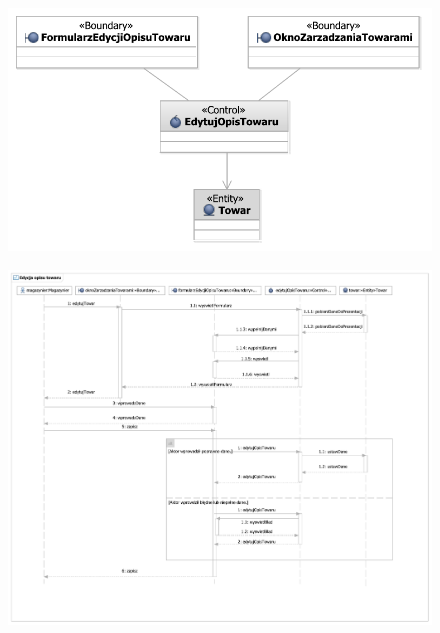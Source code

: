 \begin{figure}[H]
  \centering
  \includegraphics[angle=\ecbangle, scale=\ecbscale]{../img/usecase/pu20ecb.pdf}
  \caption{}
\end{figure}
\begin{figure}[H]
  \centering
  \includegraphics[angle=\seqangle, scale=0.45]{../img/usecase/pu20seq.pdf}
  \caption{}
\end{figure}
\newpage

